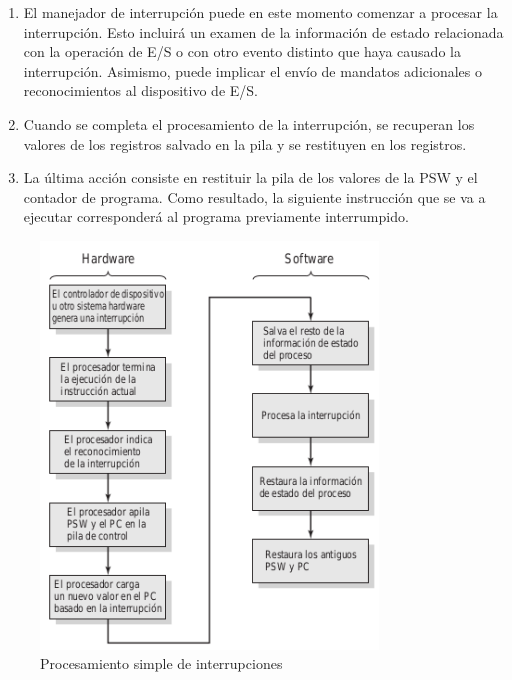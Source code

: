 \documentclass{article}
\begin{document}
\begin{enumerate}
							\item El manejador de interrupción puede en este momento comenzar a procesar la interrupción. Esto incluirá un examen de la información de estado relacionada con la operación de E/S o con otro evento distinto que haya causado la interrupción. Asimismo, puede implicar el envío de mandatos adicionales o reconocimientos al dispositivo de E/S.
							
							\item Cuando se completa el procesamiento de la interrupción, se recuperan los valores de los registros salvado en la pila y se restituyen en los registros.
							
							\item La última acción consiste en restituir la pila de los valores de la PSW y el contador de programa. Como resultado, la siguiente instrucción que se va a ejecutar corresponderá al programa previamente interrumpido.
							
						\end{enumerate}
						
						
						\begin{figure}
						\caption{Procesamiento simple de interrupciones}
						\label{figura8:procesamientointerrupciones}
						\centering
						\includegraphics[width=0.8\textwidth, scale=0.8]{figura8.png}
						\end{figure}
						
\end{document}
